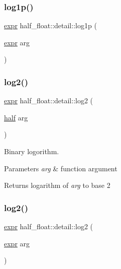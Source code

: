 \subsubsection{\texorpdfstring{log1p()}{log1p()}\hspace{0.1cm}{\footnotesize\ttfamily [2/2]}}
{\footnotesize\ttfamily \hyperlink{structhalf__float_1_1detail_1_1expr}{expr} half\+\_\+float\+::detail\+::log1p (\begin{DoxyParamCaption}\item[{\hyperlink{structhalf__float_1_1detail_1_1expr}{expr}}]{arg }\end{DoxyParamCaption})\hspace{0.3cm}{\ttfamily [inline]}}

\mbox{\label{namespacehalf__float_1_1detail_ac864f8697a78ce420e343a9c5d37118f}} 
\subsubsection{\texorpdfstring{log2()}{log2()}\hspace{0.1cm}{\footnotesize\ttfamily [1/2]}}
{\footnotesize\ttfamily \hyperlink{structhalf__float_1_1detail_1_1expr}{expr} half\+\_\+float\+::detail\+::log2 (\begin{DoxyParamCaption}\item[{\hyperlink{classhalf__float_1_1half}{half}}]{arg }\end{DoxyParamCaption})\hspace{0.3cm}{\ttfamily [inline]}}

Binary logorithm. 
\begin{DoxyParams}{Parameters}
{\em arg} & function argument \\
\hline
\end{DoxyParams}
\begin{DoxyReturn}{Returns}
logarithm of {\itshape arg} to base 2 
\end{DoxyReturn}
\mbox{\label{namespacehalf__float_1_1detail_a897c86d265108d3326d57436bcd75562}} 
\subsubsection{\texorpdfstring{log2()}{log2()}\hspace{0.1cm}{\footnotesize\ttfamily [2/2]}}
{\footnotesize\ttfamily \hyperlink{structhalf__float_1_1detail_1_1expr}{expr} half\+\_\+float\+::detail\+::log2 (\begin{DoxyParamCaption}\item[{\hyperlink{structhalf__float_1_1detail_1_1expr}{expr}}]{arg }\end{DoxyParamCaption})\hspace{0.3cm}{\ttfamily [inline]}}

